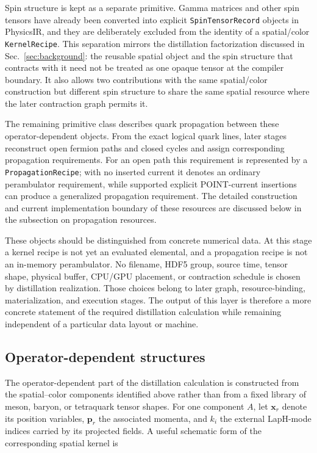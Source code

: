 \documentclass[11pt]{article}
\begin{document}
Spin structure is kept as a separate primitive. Gamma matrices and other spin
tensors have already been converted into explicit \texttt{SpinTensorRecord}
objects in PhysicsIR, and they are deliberately excluded from the identity of a
spatial/color \texttt{KernelRecipe}. This separation mirrors the distillation
factorization discussed in Sec.~\ref{sec:background}: the reusable spatial
object and the spin structure that contracts with it need not be treated as one
opaque tensor at the compiler boundary. It also allows two contributions with
the same spatial/color construction but different spin structure to share the
same spatial resource where the later contraction graph permits it.

The remaining primitive class describes quark propagation between these
operator-dependent objects. From the exact logical quark lines, later stages
reconstruct open fermion paths and closed cycles and assign corresponding
propagation requirements. For an open path this requirement is represented by a
\texttt{PropagationRecipe}; with no inserted current it denotes an ordinary
perambulator requirement, while supported explicit POINT-current insertions can
produce a generalized propagation requirement. The detailed construction and
current implementation boundary of these resources are discussed below in the
subsection on propagation resources.

These objects should be distinguished from concrete numerical data. At this
stage a kernel recipe is not yet an evaluated elemental, and a propagation
recipe is not an in-memory perambulator. No filename, HDF5 group, source time,
tensor shape, physical buffer, CPU/GPU placement, or contraction schedule is
chosen by distillation realization. Those choices belong to later graph,
resource-binding, materialization, and execution stages. The output of this
layer is therefore a more concrete statement of the required distillation
calculation while remaining independent of a particular data layout or
machine.

\subsection{Operator-dependent structures}

The operator-dependent part of the distillation calculation is constructed from
the spatial--color components identified above rather than from a fixed library
of meson, baryon, or tetraquark tensor shapes. For one component \(A\), let
\(\mathbf x_r\) denote its position variables, \(\mathbf p_r\) the associated
momenta, and \(k_i\) the external LapH-mode indices carried by its projected
fields. A useful schematic form of the corresponding spatial kernel is
\end{document}
